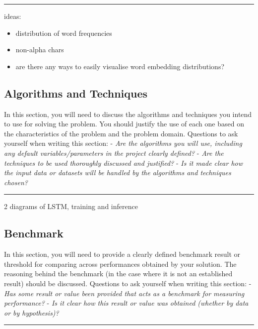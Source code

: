 \documentclass[12pt]{article}
\begin{document}
\begin{enumerate}
\begin{center}\rule{0.5\linewidth}{\linethickness}\end{center}

ideas:

\begin{itemize}
\item
  distribution of word frequencies
\item
  non-alpha chars
\item
  are there any ways to easily visualise word embedding distributions?
\end{itemize}

\subsection{Algorithms and Techniques}\label{algorithms-and-techniques}

In this section, you will need to discuss the algorithms and techniques
you intend to use for solving the problem. You should justify the use of
each one based on the characteristics of the problem and the problem
domain. Questions to ask yourself when writing this section: - \emph{Are
the algorithms you will use, including any default variables/parameters
in the project clearly defined?} - \emph{Are the techniques to be used
thoroughly discussed and justified?} - \emph{Is it made clear how the
input data or datasets will be handled by the algorithms and techniques
chosen?}

\begin{center}\rule{0.5\linewidth}{\linethickness}\end{center}

2 diagrams of LSTM, training and inference

\subsection{Benchmark}\label{benchmark}

In this section, you will need to provide a clearly defined benchmark
result or threshold for comparing across performances obtained by your
solution. The reasoning behind the benchmark (in the case where it is
not an established result) should be discussed. Questions to ask
yourself when writing this section: - \emph{Has some result or value
been provided that acts as a benchmark for measuring performance?} -
\emph{Is it clear how this result or value was obtained (whether by data
or by hypothesis)?}

\begin{center}\rule{0.5\linewidth}{\linethickness}\end{center}


\end{enumerate}
\end{document}
